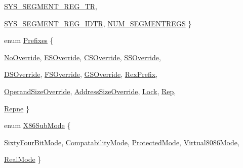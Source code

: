 \begin{DoxyCompactItemize}
$$\hyperlink{namespaceX86ISA_acea32b07c2303d31296b1c07a16c4795a7d4a3605dd03bb44b86bffc884f7acf9}{SYS\_\-SEGMENT\_\-REG\_\-TR}, 
\par
\hyperlink{namespaceX86ISA_acea32b07c2303d31296b1c07a16c4795ac023d4308917b4ec9903ea747a402436}{SYS\_\-SEGMENT\_\-REG\_\-IDTR}, 
\hyperlink{namespaceX86ISA_acea32b07c2303d31296b1c07a16c4795a43afe462b4625cd9754dacd2f25c6bf6}{NUM\_\-SEGMENTREGS}
 \}
\item 
enum \hyperlink{namespaceX86ISA_a9177933bdde69fdb102a2316ae38b2a3}{Prefixes} \{ \par
\hyperlink{namespaceX86ISA_a9177933bdde69fdb102a2316ae38b2a3af9fec9b4f7d51b7248df7ce3a85c60f1}{NoOverride}, 
\hyperlink{namespaceX86ISA_a9177933bdde69fdb102a2316ae38b2a3ae0124c17eb50a05dc56fed5e45ef749b}{ESOverride}, 
\hyperlink{namespaceX86ISA_a9177933bdde69fdb102a2316ae38b2a3af92ca81d3fb5a7a5f54434b0e9123681}{CSOverride}, 
\hyperlink{namespaceX86ISA_a9177933bdde69fdb102a2316ae38b2a3a391a6565a850313cbb7566b6d9f1d551}{SSOverride}, 
\par
\hyperlink{namespaceX86ISA_a9177933bdde69fdb102a2316ae38b2a3a1448f195560880a9871ab76bf82d9b3c}{DSOverride}, 
\hyperlink{namespaceX86ISA_a9177933bdde69fdb102a2316ae38b2a3a21c2d3faff93fc0b2e2298d4692be27e}{FSOverride}, 
\hyperlink{namespaceX86ISA_a9177933bdde69fdb102a2316ae38b2a3a5d7923c8d53cd9bc464f0d8f576e0265}{GSOverride}, 
\hyperlink{namespaceX86ISA_a9177933bdde69fdb102a2316ae38b2a3aa7a35144e4b4c598335e0f7402de72ce}{RexPrefix}, 
\par
\hyperlink{namespaceX86ISA_a9177933bdde69fdb102a2316ae38b2a3a4e92c23a3b508ce9328542e9fae4173c}{OperandSizeOverride}, 
\hyperlink{namespaceX86ISA_a9177933bdde69fdb102a2316ae38b2a3a3579abb9a5dc8f35b695f066644a6dc9}{AddressSizeOverride}, 
\hyperlink{namespaceX86ISA_a9177933bdde69fdb102a2316ae38b2a3a2d2c1d495d2836c20c94c46758ddb504}{Lock}, 
\hyperlink{namespaceX86ISA_a9177933bdde69fdb102a2316ae38b2a3a22190dd5b4be7579433dde57c66255fb}{Rep}, 
\par
\hyperlink{namespaceX86ISA_a9177933bdde69fdb102a2316ae38b2a3af518a987ca2bc3daad03f1a8bd579ae7}{Repne}
 \}
\item 
enum \hyperlink{namespaceX86ISA_a88701044b173f3a3f9c0d8b09e63eb1b}{X86SubMode} \{ \par
\hyperlink{namespaceX86ISA_a88701044b173f3a3f9c0d8b09e63eb1baf4b5a2e57762ba0a4b89a8f5dacbbf5b}{SixtyFourBitMode}, 
\hyperlink{namespaceX86ISA_a88701044b173f3a3f9c0d8b09e63eb1ba2b4096cd762e2849d1c0254e79313b8e}{CompatabilityMode}, 
\hyperlink{namespaceX86ISA_a88701044b173f3a3f9c0d8b09e63eb1ba82b7974f109f673e8bc6e1783bceae29}{ProtectedMode}, 
\hyperlink{namespaceX86ISA_a88701044b173f3a3f9c0d8b09e63eb1ba706a613113c9410e8f12261fcc3c843a}{Virtual8086Mode}, 
\par
\hyperlink{namespaceX86ISA_a88701044b173f3a3f9c0d8b09e63eb1bab71c470637aa9786a0b0c8cef9c68552}{RealMode}
 \}
\end{DoxyCompactItemize}
